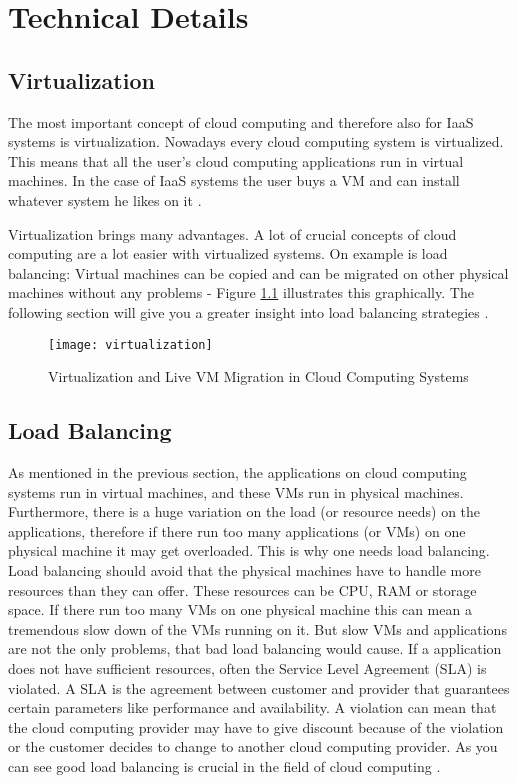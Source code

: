\chapter{Technical Details}
\label{chap:implementation}

\section{Virtualization}
The most important concept of cloud computing and therefore also for IaaS systems is virtualization. Nowadays every cloud computing system is virtualized. This means that all the user's cloud computing applications run in virtual machines. In the case of IaaS systems the user buys a VM and can install whatever system he likes on it \cite{Arzuaga_2010}. 

Virtualization brings many advantages. A lot of crucial concepts of cloud computing are a lot easier with virtualized systems. On example is load balancing: Virtual machines can be copied and can be migrated on other physical machines without any problems - Figure \ref{fig:virtualization_live_migration} illustrates this graphically. The following section will give you a greater insight into load balancing strategies \cite{Arzuaga_2010}.

\begin{figure}
	\centering
		\texttt{[image: virtualization]}
	\caption{Virtualization and Live VM Migration in Cloud Computing Systems \cite{Arzuaga_2010}}
	\label{fig:virtualization_live_migration}
\end{figure}

\section{Load Balancing}
\label{sec:load_balancing}
As mentioned in the previous section, the applications on cloud computing systems run in virtual machines, and these VMs run in physical machines. Furthermore, there is a huge variation on the load (or resource needs) on the applications, therefore if there run too many applications (or VMs) on one physical machine it may get overloaded. This is why one needs load balancing. Load balancing should avoid that the physical machines have to handle more resources than they can offer. These resources can be CPU, RAM or storage space. If there run too many VMs on one physical machine this can mean a tremendous slow down of the VMs running on it. But slow VMs and applications are not the only problems, that bad load balancing would cause. If a application does not have sufficient resources, often the Service Level Agreement (SLA) is violated. A SLA is the agreement between customer and provider that guarantees certain parameters like performance and availability. A violation can mean that the cloud computing provider may have to give discount because of the violation or the customer decides to change to another cloud computing provider. As you can see good load balancing is crucial in the field of cloud computing \cite{Chen_2014}. 

